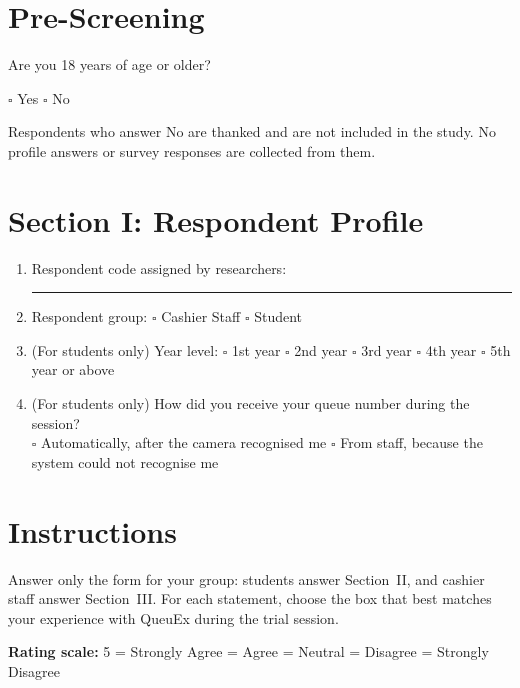 \documentclass{research}
\newcommand{\sysname}{QueuEx}
\begin{document}
\section*{Pre-Screening}

Are you 18 years of age or older?

\noindent $\square$ Yes \hspace{2em} $\square$ No

\noindent Respondents who answer No are thanked and are not included in
the study. No profile answers or survey responses are collected from
them.

\section*{Section I: Respondent Profile}

\begin{enumerate}
  \setlength{\itemsep}{1pt}
  \item Respondent code assigned by researchers:
        \rule{0.45\textwidth}{0.4pt}
  \item Respondent group:
        $\square$ Cashier Staff \quad
        $\square$ Student
  \item (For students only) Year level:
        $\square$ 1st year \quad
        $\square$ 2nd year \quad
        $\square$ 3rd year \quad
        $\square$ 4th year \quad
        $\square$ 5th year or above
  \item (For students only) How did you receive your queue number
        during the session?\\
        $\square$ Automatically, after the camera recognised me \quad
        $\square$ From staff, because the system could not recognise me
\end{enumerate}

\section*{Instructions}

Answer only the form for your group: students answer Section~II, and
cashier staff answer Section~III. For each statement, choose
the box that best matches your experience with \sysname{} during the
trial session.

\medskip
\noindent\textbf{Rating scale:} 5 = Strongly Agree  = Agree  = Neutral  = Disagree  = Strongly Disagree

\providecommand{\ratingbox}{\ensuremath{\square}}
\newcommand{\rb}{\ratingbox & \ratingbox & \ratingbox & \ratingbox & \ratingbox}
\end{document}
